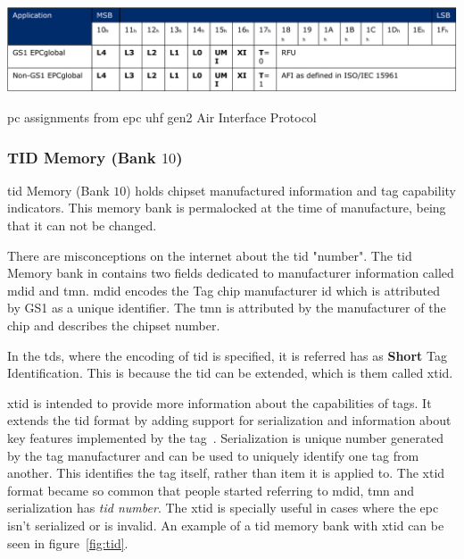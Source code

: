 \begin{table}
    \centering
    \includegraphics[width=\textwidth]{./figs/02-state-of-the-art/table_pcbits.pdf}
    \caption{\ac{pc} assignments from \ac{epc} \ac{uhf} \ac{gen2} Air Interface Protocol~\cite{Gs1epcgen2v2uhfairinterfaceI2120180904}} 
    \label{tab:pcbits}
\end{table}

\subsubsection{TID Memory (Bank $10$)}

\ac{tid} Memory (Bank $10$) holds chipset manufactured information and tag capability indicators. This memory bank is permalocked at the time of manufacture, being that it can not be changed.

There are misconceptions on the internet about the \ac{tid} "number".
The \ac{tid} Memory bank in contains two fields dedicated to manufacturer information called \ac{mdid} and \ac{tmn}.
\ac{mdid} encodes the Tag chip manufacturer \ac{id} which is attributed by GS1 as a unique identifier.
The \ac{tmn} is attributed by the manufacturer of the chip and describes the chipset number.

In the \ac{tds}, where the encoding of \ac{tid} is specified, it is referred has as \textbf{Short} Tag Identification.
This is because the \ac{tid} can be extended, which is them called \ac{xtid}.

\ac{xtid} is intended to provide more information about the capabilities of tags. It extends the \ac{tid} format by adding support for serialization and information about key features implemented by the tag~\cite{GS1EPCTDS}.
Serialization is unique number generated by the tag manufacturer and can be used to uniquely identify one tag from another.
This identifies the tag itself, rather than item it is applied to.
The \ac{xtid} format became so common that people started referring to \ac{mdid}, \ac{tmn} and serialization has \emph{\ac{tid} number}.
The \ac{xtid} is specially useful in cases where the \ac{epc} isn’t serialized or is invalid.
An example of a \ac{tid} memory bank with \ac{xtid} can be seen in figure~\ref{fig:tid}.


